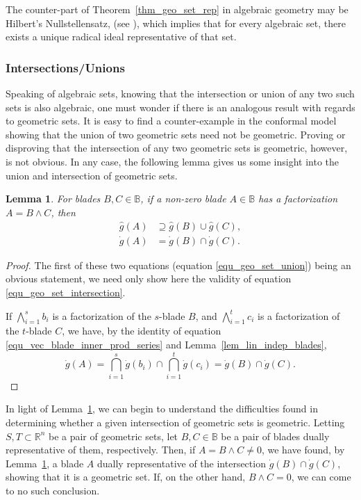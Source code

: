 \documentclass{birkjour}
\newtheorem{lem}[thm]{Lemma}
\theoremstyle{definition}
\theoremstyle{remark}
\numberwithin{equation}{section}
\newcommand{\R}{\mathbb{R}}
\newcommand{\B}{\mathbb{B}}
\newcommand{\gd}{\dot{g}}
\newcommand{\gh}{\hat{g}}
\begin{document}
The counter-part of Theorem~\ref{thm_geo_set_rep} in algebraic geometry may be Hilbert's Nullstellensatz, (see \cite[p.~206]{Garrity13}),
which implies that for every algebraic set, there exists a unique radical ideal representative of that set.

\subsubsection{Intersections/Unions}

Speaking of algebraic sets, knowing that the intersection or union of any two such sets is also algebraic,
one must wonder if there is an analogous result with regards to geometric sets.  It is easy to find a counter-example
in the conformal model showing that the union of two geometric sets need not be geometric.
Proving or disproving that the intersection of any two geometric sets is geometric, however, is not obvious.
In any case, the following lemma gives us some insight into the union and intersection of geometric sets.

\begin{lem}\label{lem_union_intersect}
For blades $B,C\in\B$, if a non-zero blade $A\in\B$ has a factorization $A=B\wedge C$, then
\begin{align}
\gh(A) &\supseteq \gh(B)\cup\gh(C),\label{equ_geo_set_union} \\
\gd(A) &= \gd(B)\cap\gd(C).\label{equ_geo_set_intersection}
\end{align}
\end{lem}
\begin{proof}
The first of these two equations (equation \eqref{equ_geo_set_union}) being an obvious statement,
we need only show here the validity of equation \eqref{equ_geo_set_intersection}.

If $\bigwedge_{i=1}^s b_i$ is a factorization of the $s$-blade $B$, and
$\bigwedge_{i=1}^t c_i$ is a factorization of the $t$-blade $C$, we have,
by the identity of equation \eqref{equ_vec_blade_inner_prod_series} and Lemma~\ref{lem_lin_indep_blades},
\begin{equation}
\gd(A) = \bigcap_{i=1}^s\gd(b_i)\cap\bigcap_{i=1}^t\gd(c_i) = \gd(B)\cap\gd(C).
\end{equation}
\end{proof}

In light of Lemma~\ref{lem_union_intersect}, we can begin to understand the difficulties found in determining
whether a given intersection of geometric sets is geometric.  Letting $S,T\subset\R^n$ be
a pair of geometric sets, let $B,C\in\B$ be a pair of blades dually representative of them, respectively.
Then, if $A=B\wedge C\neq 0$, we have found, by Lemma~\ref{lem_union_intersect}, a blade $A$ dually
representative of the intersection $\gd(B)\cap\gd(C)$, showing that it is a geometric set.
If, on the other hand, $B\wedge C=0$, we can come to no such conclusion.
\end{document}

